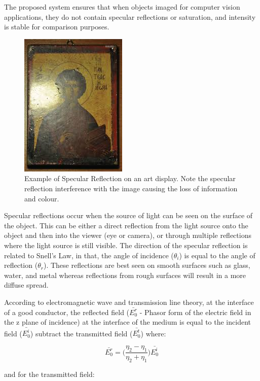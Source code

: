 \documentclass[fleqn,twoside,12pt]{report}
\begin{document}
The proposed system ensures that when objects imaged for computer vision applications, they do not contain specular reflections or saturation, and intensity is stable for comparison purposes. 

\begin{figure}[h]
	\centering
	\includegraphics[scale=0.9]{specular_art.jpg}
	\caption{Example of Specular Reflection on an art display. Note the specular reflection interference with the image causing the loss of information and colour.}
	\label{fig:specular_art}
\end{figure}


Specular reflections occur when the source of light can be seen on the surface of the object. This can be either a direct reflection from the light source onto the object and then into the viewer (eye or camera), or through multiple reflections where the light source is still visible. The direction of the specular reflection is related to Snell's Law, in that, the angle of incidence ($\theta_i$) is equal to the angle of reflection ($\theta_r$). These reflections are best seen on smooth surfaces such as glass, water, and metal whereas reflections from rough surfaces will result in a more diffuse spread.   

According to electromagnetic wave and transmission line theory, at the interface of a good conductor, the reflected field ($\bar{E_0^r}$ - Phasor form of the electric field in the z plane of incidence) at the interface of the medium is equal to the incident field ($\bar{E_0^i}$) subtract the transmitted field ($\bar{E_0^t}$) \cite{ulaby} where:

\begin{equation}
\bar{E_0^r} = \bigg(\frac{\eta_2 - \eta_1}{\eta_2 + \eta_1}\bigg)\bar{E_0^i}
\end{equation}

and for the transmitted field:
\end{document}
